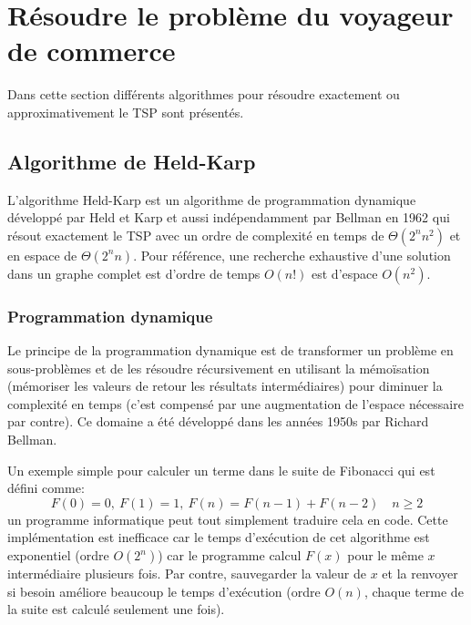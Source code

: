 \documentclass[../main.tex]{subfiles}
\begin{document}
\section{Résoudre le problème du voyageur de commerce}
Dans cette section différents algorithmes pour résoudre exactement ou approximativement le TSP sont présentés.

\subsection{Algorithme de Held-Karp}
L'algorithme Held-Karp est un algorithme de programmation dynamique développé par Held et Karp \cite{Held1962} et aussi indépendamment par Bellman \cite{Bellman1962} en 1962 qui résout exactement le TSP avec un ordre de complexité en temps de $\Theta (2^n n^2)$ et en espace de $\Theta (2^n n)$. Pour référence, une recherche exhaustive d'une solution dans un graphe complet est d'ordre de temps $O(n!)$ est d'espace $O(n^2)$.

\subsubsection*{Programmation dynamique}
Le principe de la programmation dynamique est de transformer un problème en sous-problèmes et de les résoudre récursivement en utilisant la mémoïsation (mémoriser les valeurs de retour les résultats intermédiaires) pour diminuer la complexité en temps (c'est compensé par une augmentation de l'espace nécessaire par contre). Ce domaine a été développé dans les années 1950s par Richard Bellman.

Un exemple simple pour calculer un terme dans le suite de Fibonacci qui est défini comme: 
\[
F(0) = 0, \ F(1)=1,\ F(n)=F(n-1)+F(n-2) \quad n \geq 2
\]
un programme informatique peut tout simplement traduire cela en code. Cette implémentation est inefficace car le temps d'exécution de cet algorithme est exponentiel (ordre $O(2^n)$) car le programme calcul $F(x)$ pour le même $x$ intermédiaire plusieurs fois. Par contre, sauvegarder la valeur de $x$ et la renvoyer si besoin améliore beaucoup le temps d'exécution (ordre $O(n)$, chaque terme de la suite est calculé seulement une fois).
\end{document}
